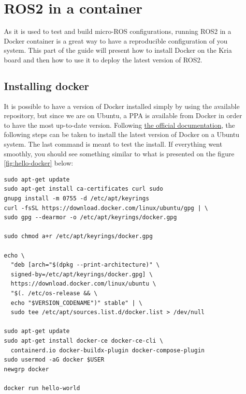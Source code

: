 \documentclass[10pt]{article}
\begin{document}
\section{ROS2 in a container}
As it is used to test and build micro-ROS configurations, running ROS2 in a
Docker container is a great way to have a reproducible configuration
of you system. This part of the guide will present how to install Docker on the
Kria board and then how to use it to deploy the latest version of ROS2.

\subsection{Installing docker}
It is possible to have a version of Docker installed simply by using the available repository, but since we are on Ubuntu, a PPA is available
from Docker in order to have the most up-to-date version.
Following \href{https://docs.docker.com/engine/install/ubuntu/#install-using-the-repository}{the official documentation}, the following steps can be taken to
install the latest version of Docker on a Ubuntu system.
The last command is meant to test the install. If everything went smoothly, you should see something similar to what is presented on the figure \ref{fig:hello-docker} below:
\begin{tcolorbox}
\begin{verbatim}
sudo apt-get update
sudo apt-get install ca-certificates curl sudo
gnupg install -m 0755 -d /etc/apt/keyrings
curl -fsSL https://download.docker.com/linux/ubuntu/gpg | \
sudo gpg --dearmor -o /etc/apt/keyrings/docker.gpg

sudo chmod a+r /etc/apt/keyrings/docker.gpg

echo \
  "deb [arch="$(dpkg --print-architecture)" \
  signed-by=/etc/apt/keyrings/docker.gpg] \
  https://download.docker.com/linux/ubuntu \
  "$(. /etc/os-release && \
  echo "$VERSION_CODENAME")" stable" | \
  sudo tee /etc/apt/sources.list.d/docker.list > /dev/null

sudo apt-get update
sudo apt-get install docker-ce docker-ce-cli \
  containerd.io docker-buildx-plugin docker-compose-plugin
sudo usermod -aG docker $USER
newgrp docker

docker run hello-world
\end{verbatim}
\end{tcolorbox}
\end{document}

